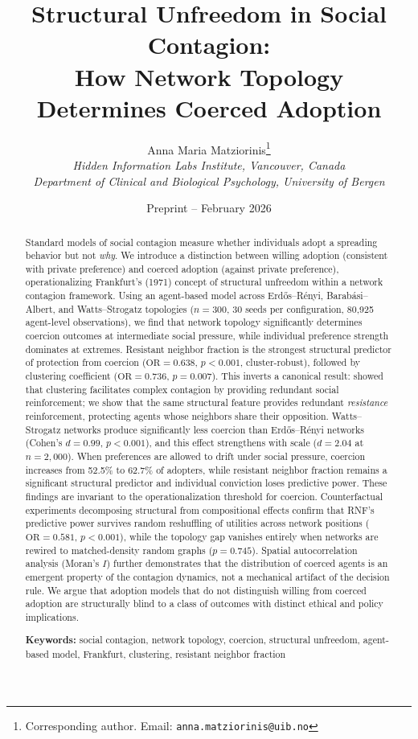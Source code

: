 \documentclass[11pt, a4paper]{article}
\title{Structural Unfreedom in Social Contagion:\\
How Network Topology Determines Coerced Adoption}
\author{
Anna Maria Matziorinis\thanks{Corresponding author. Email: \texttt{anna.matziorinis@uib.no}}\\
\textit{Hidden Information Labs Institute, Vancouver, Canada}\\
\textit{Department of Clinical and Biological Psychology, University of Bergen}
}
\date{Preprint -- February 2026}
\newcommand{\OR}{\text{OR}}
\begin{document}
\maketitle

\begin{abstract}
Standard models of social contagion measure whether individuals adopt a spreading behavior but not \textit{why}. We introduce a distinction between willing adoption (consistent with private preference) and coerced adoption (against private preference), operationalizing Frankfurt's (1971) concept of structural unfreedom within a network contagion framework. Using an agent-based model across Erd\H{o}s--R\'{e}nyi, Barab\'{a}si--Albert, and Watts--Strogatz topologies ($n=300$, 30 seeds per configuration, 80{,}925 agent-level observations), we find that network topology significantly determines coercion outcomes at intermediate social pressure, while individual preference strength dominates at extremes. Resistant neighbor fraction is the strongest structural predictor of protection from coercion ($\OR = 0.638$, $p < 0.001$, cluster-robust), followed by clustering coefficient ($\OR = 0.736$, $p = 0.007$). This inverts a canonical result: \citet{centola2007complex} showed that clustering facilitates complex contagion by providing redundant social reinforcement; we show that the same structural feature provides redundant \textit{resistance} reinforcement, protecting agents whose neighbors share their opposition. Watts--Strogatz networks produce significantly less coercion than Erd\H{o}s--R\'{e}nyi networks (Cohen's $d = 0.99$, $p < 0.001$), and this effect strengthens with scale ($d = 2.04$ at $n = 2{,}000$). When preferences are allowed to drift under social pressure, coercion increases from 52.5\% to 62.7\% of adopters, while resistant neighbor fraction remains a significant structural predictor and individual conviction loses predictive power. These findings are invariant to the operationalization threshold for coercion. Counterfactual experiments decomposing structural from compositional effects confirm that RNF's predictive power survives random reshuffling of utilities across network positions ($\OR = 0.581$, $p < 0.001$), while the topology gap vanishes entirely when networks are rewired to matched-density random graphs ($p = 0.745$). Spatial autocorrelation analysis (Moran's $I$) further demonstrates that the distribution of coerced agents is an emergent property of the contagion dynamics, not a mechanical artifact of the decision rule. We argue that adoption models that do not distinguish willing from coerced adoption are structurally blind to a class of outcomes with distinct ethical and policy implications.

\medskip
\noindent\textbf{Keywords:} social contagion, network topology, coercion, structural unfreedom, agent-based model, Frankfurt, clustering, resistant neighbor fraction
\end{abstract}
\end{document}
